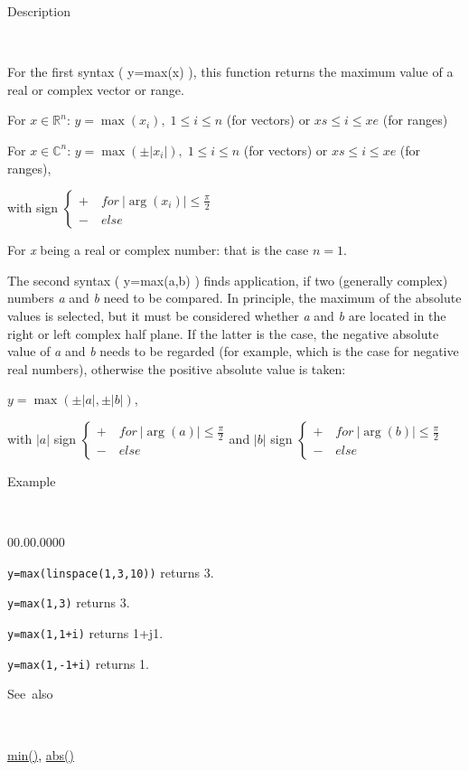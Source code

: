 \begin{description}
\item [Description]~
\end{description}
For the first syntax ( y=max(x) ), this function returns the maximum
value of a real or complex vector or range.

\medskip{}
For $x\in$$\mathbb{R}^{n}$: $y=$$\max\left(x_{i}\right),\;1\leq i\leq n$
(for vectors) or $xs\leq i\leq xe$ (for ranges)
\medskip{}

For $x\in\mathbb{C}^{n}$: $y=\max\left(\pm\left|x_{i}\right|\right),\;1\leq i\leq n$
(for vectors) or $xs\leq i\leq xe$ (for ranges),

with sign $\left\{ \begin{array}{l}
+\quad for\:\left|\arg\left(x_{i}\right)\right|\leq\frac{\pi}{2}\\
-\quad else\end{array}\right.$
\medskip{}

For \textit{x} being a real or complex number: that is the
case $n=1$.

The second syntax ( y=max(a,b) ) finds application, if two (generally
complex) numbers \textit{a} and \textit{b} need to be compared. In
principle, the maximum of the absolute values is selected, but it
must be considered whether \textit{a} and \textit{b} are located in
the right or left complex half plane. If the latter is the case, the
negative absolute value of \textit{a} and \textit{b} needs to be regarded
(for example, which is the case for negative real numbers), otherwise
the positive absolute value is taken:

\medskip{}
$y=\max\left(\pm\left|a\right|,\pm\left|b\right|\right)$,

with $\left|a\right|$ sign $\left\{ \begin{array}{l}
+\quad for\:\left|\arg\left(a\right)\right|\leq\frac{\pi}{2}\\
-\quad else\end{array}\right.$and $\left|b\right|$ sign $\left\{ \begin{array}{l}
+\quad for\:\left|\arg\left(b\right)\right|\leq\frac{\pi}{2}\\
-\quad else\end{array}\right.$
\medskip{}

\begin{description}
\item [Example]~
\end{description}
\begin{lyxlist}{00.00.0000}
\item [\texttt{y=max(linspace(1,3,10))}]returns 3.
\item [\texttt{y=max(1,3)}]returns 3.
\item [\texttt{y=max(1,1+i)}]returns 1+j1.
\item [\texttt{y=max(1,-1+i)}]returns 1.
\end{lyxlist}
\begin{description}
\item [See~also]~
\end{description}
\textcolor{blue}{\hyperlink{min}{min()}}\textcolor{black}{,} \textcolor{blue}{\hyperlink{abs}{abs()}}


